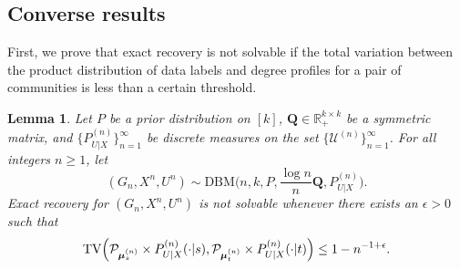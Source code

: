 \documentclass[11pt]{article}
\theoremstyle{plain}
\newtheorem{lemma}[theorem]{Lemma}
\theoremstyle{definition}
\begin{document}
\subsection{Converse results}
\label{sub:nec}
First, we prove that exact recovery is not solvable if the total variation between the product distribution
of data labels and degree profiles for a pair of communities is less than a certain threshold.

\begin{lemma}
\label{thm:TV}
Let $P$ be a prior distribution on $[k]$, $\mathbf{Q}\in \mathbb{R}_+^{k\times k}$ be a symmetric matrix, and $\{P^{(n)}_{U|X}\}_{n=1}^{\infty}$ be discrete measures on the set $\{\mathcal{U}^{(n)}\}_{n=1}^{\infty}$. For all integers $n\geq 1$, let \[(G_n,X^n,U^n)\sim \mathrm{DBM}\biggl(n,k,P,\frac{\log n}{n}\mathbf{Q},
	 P^{(n)}_{U|X}\biggr).\] 
Exact recovery for 
$(G_n,X^n,U^n)$
is not solvable whenever there exists  an $\epsilon > 0$
such that
\[
\mathrm{TV}\Bigl(\mathcal{P}_{\boldsymbol{\mu}^{(n)}_s} \times P_{U|X}^{(n)}(\cdot|s)  , 
               \mathcal{P}_{\boldsymbol{\mu}^{(n)}_t}  \times P_{U|X}^{(n)}(\cdot|t) \Bigr)
\le 1 - n^{-1 +\epsilon}.
\]
\end{lemma}
\end{document}
